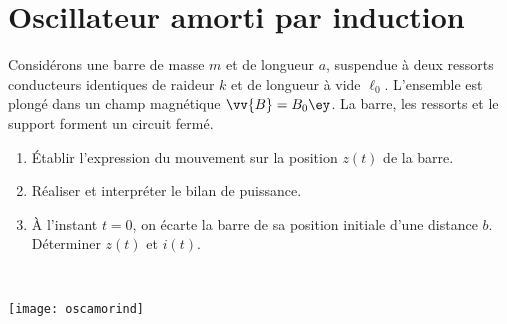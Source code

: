 \documentclass[a4paper, 10pt, final, garamond]{book}
\begin{document}
\section{Oscillateur amorti par induction}
\label{sec:oscamorind}
\noindent
\begin{minipage}[t]{.70\linewidth}
	Considérons une barre de masse $m$ et de longueur $a$, suspendue à deux
	ressorts conducteurs identiques de raideur $k$ et de longueur à vide $\ell_0$.
	L'ensemble est plongé dans un champ magnétique $\vv{B} = B_0\ey$. La barre,
	les ressorts et le support forment un circuit fermé.
	\begin{enumerate}
		\item Établir l'expression du mouvement sur la position $z(t)$ de la barre.
		\item Réaliser et interpréter le bilan de puissance.
		\item À l'instant $t = 0$, on écarte la barre de sa position initiale d'une
		      distance $b$. Déterminer $z(t)$ et $i(t)$.
	\end{enumerate}
\end{minipage}
\hfill
\begin{minipage}[t]{.25\linewidth}
	~
	\vspace*{-10pt}
	\begin{center}
		\texttt{[image: oscamorind]}
		\label{fig:oscamorind}
	\end{center}
\end{minipage}
\end{document}
